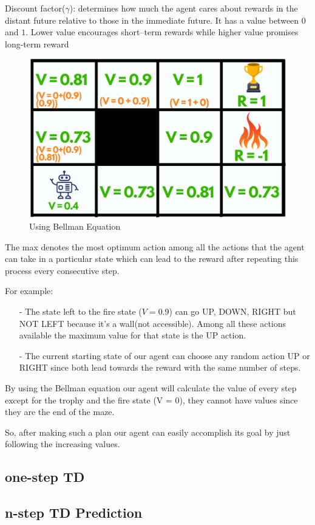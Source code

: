 Discount factor($\gamma$): determines how much the agent cares about rewards 
in the distant future relative to those in the immediate future. It has a value 
between $0$ and $1$. Lower value encourages short–term rewards while higher 
value promises long-term reward

\begin{figure}[h]
\centering
\includegraphics[scale=0.3]{pix/maze_bellman.png}
\caption{Using Bellman Equation}
\end{figure}

The max denotes the most optimum action among all the actions that the agent can 
take in a particular state which can lead to the reward after repeating this 
process every consecutive step.  

For example:

\begin{itemize}
\setlength{\parskip}{0pt}
\item[-]
The state left to the fire state ($V = 0.9$) can go UP, DOWN, RIGHT but NOT LEFT 
because it's a wall(not accessible). Among all these actions available the maximum 
value for that state is the UP action.

\item[-]
The current starting state of our agent can choose any random action UP or RIGHT 
since both lead towards the reward with the same number of steps.
\end{itemize}

By using the Bellman equation our agent will calculate the value of every step 
except for the trophy and the fire state (V = 0), they cannot have values since 
they are the end of the maze.

So, after making such a plan our agent can easily accomplish its goal by just 
following the increasing values.


\subsection{one-step TD}



\subsection{n-step TD Prediction}



